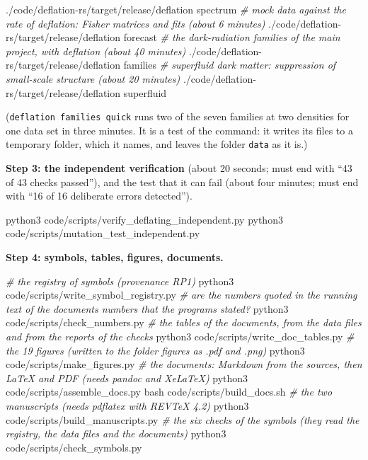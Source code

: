 \documentclass[
  10pt,
]{article}
\newenvironment{Shaded}{}{}
\newcommand{\CommentTok}[1]{\textcolor[rgb]{0.38,0.63,0.69}{\textit{#1}}}
\newcommand{\ExtensionTok}[1]{#1}
\newcommand{\FunctionTok}[1]{\textcolor[rgb]{0.02,0.16,0.49}{#1}}
\newcommand{\NormalTok}[1]{#1}
\begin{document}
\begin{Shaded}
\begin{Highlighting}[]
\ExtensionTok{./code/deflation{-}rs/target/release/deflation}\NormalTok{ spectrum}
\CommentTok{\# mock data against the rate of deflation: Fisher matrices and fits   (about 6 minutes)}
\ExtensionTok{./code/deflation{-}rs/target/release/deflation}\NormalTok{ forecast}
\CommentTok{\# the dark{-}radiation families of the main project, with deflation     (about 40 minutes)}
\ExtensionTok{./code/deflation{-}rs/target/release/deflation}\NormalTok{ families}
\CommentTok{\# superfluid dark matter: suppression of small{-}scale structure        (about 20 minutes)}
\ExtensionTok{./code/deflation{-}rs/target/release/deflation}\NormalTok{ superfluid}
\end{Highlighting}
\end{Shaded}

(\texttt{deflation\ families\ quick} runs two of the seven families at
two densities for one data set in three minutes. It is a test of the
command: it writes its files to a temporary folder, which it names, and
leaves the folder \texttt{data} as it is.)

\textbf{Step 3: the independent verification} (about 20 seconds; must
end with ``43 of 43 checks passed''), and the test that it can fail
(about four minutes; must end with ``16 of 16 deliberate errors
detected'').

\begin{Shaded}
\begin{Highlighting}[]
\ExtensionTok{python3}\NormalTok{ code/scripts/verify\_deflating\_independent.py}
\ExtensionTok{python3}\NormalTok{ code/scripts/mutation\_test\_independent.py}
\end{Highlighting}
\end{Shaded}

\textbf{Step 4: symbols, tables, figures, documents.}

\begin{Shaded}
\begin{Highlighting}[]
\CommentTok{\# the registry of symbols (provenance RP1)}
\ExtensionTok{python3}\NormalTok{ code/scripts/write\_symbol\_registry.py}
\CommentTok{\# are the numbers quoted in the running text of the documents numbers that the programs stated?}
\ExtensionTok{python3}\NormalTok{ code/scripts/check\_numbers.py}
\CommentTok{\# the tables of the documents, from the data files and from the reports of the checks}
\ExtensionTok{python3}\NormalTok{ code/scripts/write\_doc\_tables.py}
\CommentTok{\# the 19 figures (written to the folder figures as .pdf and .png)}
\ExtensionTok{python3}\NormalTok{ code/scripts/make\_figures.py}
\CommentTok{\# the documents: Markdown from the sources, then LaTeX and PDF (needs pandoc and XeLaTeX)}
\ExtensionTok{python3}\NormalTok{ code/scripts/assemble\_docs.py}
\FunctionTok{bash}\NormalTok{ code/scripts/build\_docs.sh}
\CommentTok{\# the two manuscripts (needs pdflatex with REVTeX 4.2)}
\ExtensionTok{python3}\NormalTok{ code/scripts/build\_manuscripts.py}
\CommentTok{\# the six checks of the symbols (they read the registry, the data files and the documents)}
\ExtensionTok{python3}\NormalTok{ code/scripts/check\_symbols.py}
\end{Highlighting}
\end{Shaded}
\end{document}
